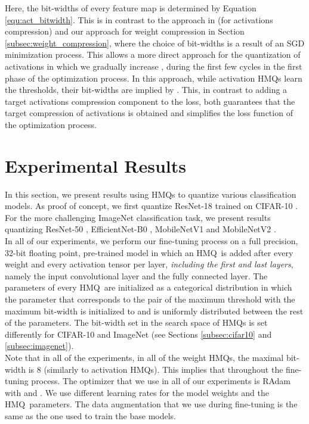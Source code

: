 \documentclass{article}
\newcommand{\qb}{HMQ}
\begin{document}
Here, the bit-widths of every feature map is determined by Equation \ref{equ:act_bitwidth}.
This is in contrast to the approach in \cite{Uhlich2020Mixed} (for activations compression) and our approach for weight compression in Section \ref{subsec:weight_compression}, where the choice of bit-widths is a result of an SGD minimization process.
This allows a more direct approach for the quantization of activations in which we gradually increase , during the first few cycles in the first phase of the optimization process.
In this approach, while activation \qb s learn the thresholds, their bit-widths are implied by .
This, in contrast to adding a target activations compression component to the loss, both guarantees that the target compression of activations is obtained and simplifies the loss function of the optimization process.



 \section{Experimental Results}\label{se:experimental}
In this section, we present results using \qb s to quantize various classification models.
As proof of concept, we first quantize ResNet-18 \cite{he2016deep} trained on \mbox{CIFAR-10} \cite{krizhevsky2009learning}.
For the more challenging ImageNet \cite{deng2009imagenet} classification task, we present results quantizing ResNet-50 \cite{he2016deep}, EfficientNet-B0 \cite{tan2019efficientnet}, MobileNetV1 \cite{howard2017mobilenets} and MobileNetV2 \cite{sandler2018mobilenetv2}.
\\

In all of our experiments, we perform our fine-tuning process on a full precision, \mbox{32-bit} floating point, pre-trained model in which an \qb\ is added after every weight and every activation tensor per layer, \textit{including the first and last layers}, namely the input convolutional layer and the fully connected layer.  
The parameters  of every \qb\ are initialized as a categorical distribution in which the parameter that corresponds to the pair of the maximum threshold with the maximum bit-width is initialized to  and  is uniformly distributed between the rest of the parameters.
The bit-width set  in the search space of \qb s is set differently for CIFAR-10 and ImageNet (see Sections \ref{subsec:cifar10} and \ref{subsec:imagenet}).\\

Note that in all of the experiments, in all of the weight \qb s, the maximal bit-width is 8 (similarly to activation \qb s). 
This implies that   throughout the fine-tuning process.
The optimizer that we use in all of our experiments is RAdam \cite{liu2019variance} with  and .
We use different learning rates for the model weights and the \qb\ parameters.
The data augmentation that we use during fine-tuning is the same as the one used to train the base models.
\\
\end{document}
